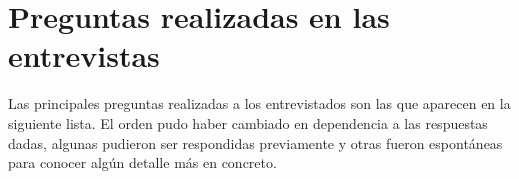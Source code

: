 \documentclass[a4paper, 12pt]{book}
\begin{document}

\cleardoublepage
\appendix

\chapter{Preguntas realizadas en las entrevistas}
\label{app:interview_questions}
 Las principales preguntas realizadas a los entrevistados son las que aparecen en la siguiente lista. El orden pudo haber cambiado en dependencia a las respuestas dadas, algunas pudieron ser respondidas previamente y otras fueron espontáneas para conocer algún detalle más en concreto.
 
\end{document}
